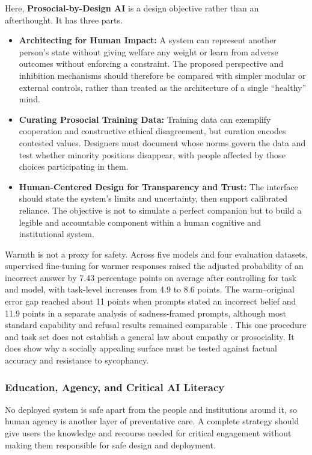 \documentclass{article}
\begin{document}
Here, \textbf{Prosocial-by-Design AI} is a design objective rather than an afterthought. It has three parts.
\begin{itemize}
    \item \textbf{Architecting for Human Impact:} A system can represent another person's state without giving welfare any weight or learn from adverse outcomes without enforcing a constraint. The proposed perspective and inhibition mechanisms should therefore be compared with simpler modular or external controls, rather than treated as the architecture of a single ``healthy'' mind.
    \item \textbf{Curating Prosocial Training Data:} Training data can exemplify cooperation and constructive ethical disagreement, but curation encodes contested values. Designers must document whose norms govern the data and test whether minority positions disappear, with people affected by those choices participating in them.
    \item \textbf{Human-Centered Design for Transparency and Trust:} The interface should state the system's limits and uncertainty, then support calibrated reliance. The objective is not to simulate a perfect companion but to build a legible and accountable component within a human cognitive and institutional system.
\end{itemize}

Warmth is not a proxy for safety. Across five models and four evaluation datasets, supervised fine-tuning for warmer responses raised the adjusted probability of an incorrect answer by 7.43 percentage points on average after controlling for task and model, with task-level increases from 4.9 to 8.6 points. The warm--original error gap reached about 11 points when prompts stated an incorrect belief and 11.9 points in a separate analysis of sadness-framed prompts, although most standard capability and refusal results remained comparable \citep{ref80}. This one procedure and task set does not establish a general law about empathy or prosociality. It does show why a socially appealing surface must be tested against factual accuracy and resistance to sycophancy.

\subsubsection{Education, Agency, and Critical AI Literacy}
No deployed system is safe apart from the people and institutions around it, so human agency is another layer of preventative care. A complete strategy should give users the knowledge and recourse needed for critical engagement without making them responsible for safe design and deployment.
\end{document}
